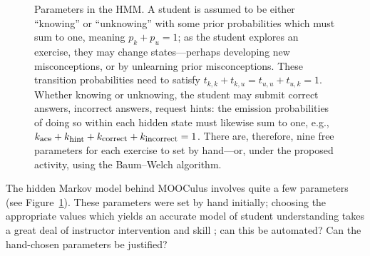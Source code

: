 \documentclass[12pt]{article}
\begin{document}
\begin{figure}
\begin{center}
\end{center}
  \caption{Parameters in the HMM.  A student is assumed to be either ``knowing'' or ``unknowing'' with some prior probabilities which must sum to one, meaning $p_k + p_u = 1$; as the student explores an exercise, they may change states---perhaps developing new misconceptions, or by unlearning prior misconceptions.  These transition probabilities need to satisfy $t_{k,k} + t_{k,u} = t_{u,u} + t_{u,k} = 1$.  Whether knowing or unknowing, the student may submit correct answers, incorrect answers, request hints: the emission probabilities of doing so within each hidden state must likewise sum to one, e.g.,$k_{\mbox{\footnotesize ace}} + k_{\mbox{\footnotesize hint}} + k_{\mbox{\footnotesize correct}} + k_{\mbox{\footnotesize incorrect}}=1$.  There are, therefore, nine free parameters for each exercise to set by hand---or, under the proposed activity, using the Baum--Welch algorithm.}
  \label{fig:parameters}
\end{figure}

The hidden Markov model behind MOOCulus involves quite a few
parameters (see Figure~\ref{fig:parameters}).  These parameters were
set by hand initially; choosing the appropriate values which yields an
accurate model of student understanding takes a great deal of
instructor intervention and skill \parencite{romero2010educational};
can this be automated?  Can the hand-chosen parameters be justified?
\end{document}
